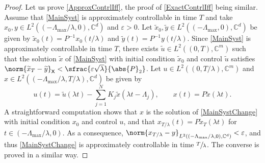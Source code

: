 \begin{proof}
Let us prove \eqref{ApproxContrlIff}, the proof of \eqref{ExactContrlIff} being similar. Assume that \eqref{MainSyst} is approximately controllable in time $T$ and take $x_0, y \in L^2((-\Lambda_{\max}/\lambda, 0), \mathbb C^d)$ and $\varepsilon > 0$. Let $\widetilde x_0, \widetilde{y} \in L^2((-\Lambda_{\max}, 0), \mathbb C^d)$ be given by $\widetilde x_0(t) = P^{-1} x_0(t/\lambda)$ and $\widetilde{y}(t) = P^{-1} y(t/\lambda)$. Since \eqref{MainSyst} is approximately controllable in time $T$, there exists $\widetilde u \in L^2((0, T), \mathbb C^m)$ such that the solution $\widetilde x$ of \eqref{MainSyst} with initial condition $\widetilde x_0$ and control $\widetilde u$ satisfies $\norm{\widetilde x_T - \widetilde{y}}_{\mathsf X} < \sfrac{\varepsilon \sqrt{\lambda}}{\abs{P}_{2}}$. Let $u \in L^2((0, T/\lambda), \mathbb C^m)$ and $x \in L^2((-\Lambda_{\max}/\lambda, T/\lambda), \mathbb C^d)$ be given by
\[
u(t) = \widetilde u(\lambda t) - \sum_{j=1}^N K_j \widetilde x(\lambda t - \Lambda_j), \qquad x(t) = P \widetilde x(\lambda t).
\]
A straightforward computation shows that $x$ is the solution of \eqref{MainSystChange} with initial condition $x_0$ and control $u$, and that $x_{T/\lambda}(t) = P \widetilde x_T(\lambda t)$ for $t \in (-\Lambda_{\max}/\lambda, 0)$. As a consequence,
$\norm{x_{T/\lambda} - y}_{L^2((-\Lambda_{\max}/\lambda, 0), \mathbb C^d)}  < \varepsilon$, and thus \eqref{MainSystChange} is approximately controllable in time $\sfrac{T}{\lambda}$. The converse is proved in a similar way.
\end{proof}

